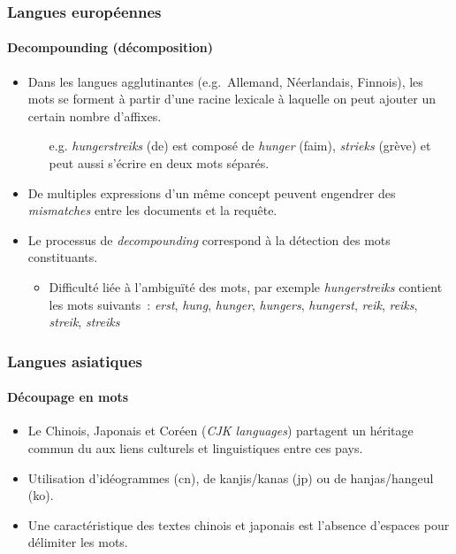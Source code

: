 \documentclass[11pt,aspectratio=43,dvipsnames,table]{beamer}
\begin{document}
\begin{frame}
    \frametitle{Langues européennes}
    \framesubtitle{Decompounding (décomposition)}
    \begin{itemize} \itemsep10pt
        \item Dans les langues agglutinantes (e.g.~Allemand, Néerlandais, 
              Finnois), les mots se forment à partir d'une racine lexicale à 
              laquelle on peut ajouter un certain nombre d'affixes.
        \begin{itemize}
            \item[e.g.] \textit{hungerstreiks} (de) est composé de 
                  \textit{hunger} (faim), \textit{strieks} (grève) et peut aussi
                  s'écrire en deux mots séparés.
        \end{itemize}
        \item De multiples expressions d'un même concept peuvent engendrer des 
              \textit{mismatches} entre les documents et la requête.
        \item Le processus de \textit{decompounding} correspond à la détection 
              des mots constituants.
        \begin{itemize}
            \item Difficulté liée à l'ambiguïté des mots, par exemple 
                  \textit{hungerstreiks} contient les mots suivants~: 
                  \textit{erst}, \textit{hung}, \textit{hunger}, 
                  \textit{hungers}, \textit{hungerst}, \textit{reik}, 
                  \textit{reiks}, \textit{streik}, \textit{streiks}
        \end{itemize} 
    \end{itemize}
\end{frame}


\begin{frame}
    \frametitle{Langues asiatiques}
    \framesubtitle{Découpage en mots}
    \begin{itemize} \itemsep10pt
        \item Le Chinois, Japonais et Coréen (\textit{CJK languages}) partagent 
              un héritage commun du aux liens culturels et linguistiques entre 
              ces pays.
        \item Utilisation d'idéogrammes (cn), de kanjis/kanas (jp) ou de 
              hanjas/hangeul (ko).
        \item Une caractéristique des textes chinois et japonais est l'absence 
              d'espaces pour délimiter les mots.
    \end{itemize}
\end{frame}
\end{document}
